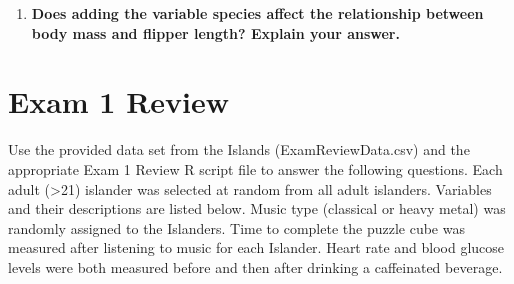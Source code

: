 \documentclass[
]{report}
\providecommand{\tightlist}{%
  \setlength{\itemsep}{0pt}\setlength{\parskip}{0pt}}
\begin{document}
\vspace{0.3in}

\begin{enumerate}
\def\labelenumi{\arabic{enumi}.}
\setcounter{enumi}{10}
\tightlist
\item
  \textbf{Does adding the variable species affect the relationship between body mass and flipper length? Explain your answer.}
\end{enumerate}

\newpage

\hypertarget{exam-1-review}{%
\chapter{Exam 1 Review}\label{exam-1-review}}

Use the provided data set from the Islands (ExamReviewData.csv) and the appropriate Exam 1 Review R script file to answer the following questions. Each adult (\textgreater21) islander was selected at random from all adult islanders. Variables and their descriptions are listed below. Music type (classical or heavy metal) was randomly assigned to the Islanders. Time to complete the puzzle cube was measured after listening to music for each Islander. Heart rate and blood glucose levels were both measured before and then after drinking a caffeinated beverage.
\end{document}
